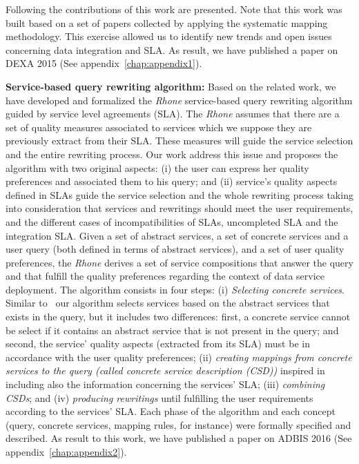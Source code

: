 Following the contributions of this work are presented. Note that this work was built based on a set of papers collected by applying the systematic mapping methodology. This exercise allowed us to identify new trends and open issues concerning data integration and SLA. As result, we have published a paper on DEXA 2015 (See appendix~\ref{chap:appendix1}).

	
\bigskip
\noindent \textbf{Service-based query rewriting algorithm:}
Based on the related work, we have developed and formalized the \textit{Rhone} service-based query rewriting algorithm guided by service level agreements (SLA). The \textit{Rhone} assumes that there are a set of quality measures associated to services which we suppose they are previously extract from their SLA. These measures will guide the service selection and the entire rewriting process.  Our work address this issue and proposes the algorithm with two original aspects: (i) the user can express her quality preferences and associated them to his query; and (ii) service's quality aspects defined in SLAs guide the service selection and the whole rewriting process taking into consideration that services and rewritings should meet the user requirements, and the different cases of incompatibilities of SLAs, uncompleted SLA and the integration SLA. 
Given a set of abstract services, a set of concrete services and a user query (both defined in terms of abstract services), and a set of user quality preferences, the \textit{Rhone} derives a set of service compositions that answer the query and that fulfill the quality preferences regarding the context of data service deployment. The algorithm consists in four steps: (i) \textit{Selecting concrete services}. Similar to~\cite{Levy:1996,Pottinger:2001} our algorithm selects services based on the abstract services that exists in the query, but it includes two differences: first, a concrete service cannot be select if it contains an abstract service that is not present in the query; and second, the service' quality aspects (extracted from its SLA) must be in accordance with the user quality preferences; (ii) \textit{creating mappings from concrete services to the query (called concrete service description (CSD))} inspired in~\cite{Pottinger:2001} including also the information concerning the services' SLA; (iii) \textit{combining CSDs}; and (iv) \textit{producing rewritings} until fulfilling the user requirements according to the services' SLA. Each phase of the algorithm and each concept (query, concrete services, mapping rules, for instance) were formally specified and described. As result to this work, we have published a paper on ADBIS 2016 (See appendix~\ref{chap:appendix2}).


